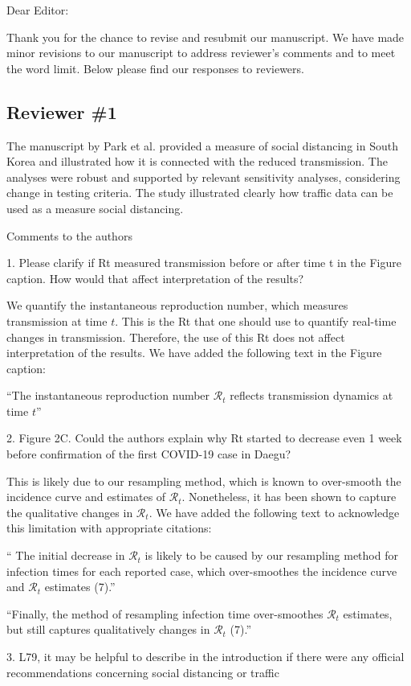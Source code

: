 \documentclass[12pt]{article}
\newcommand{\rev}{\subsection*}
\newcommand{\revtext}{\textsf}
\begin{document}
\noindent Dear Editor:

Thank you for the chance to revise and resubmit our manuscript. 
We have made minor revisions to our manuscript to address reviewer's comments and to meet the word limit.
Below please find our responses to reviewers.

\rev{Reviewer \#1}

\revtext{The manuscript by Park et al. provided a measure of social distancing in South Korea and illustrated how it is connected with the reduced transmission. The analyses were robust and supported by relevant sensitivity analyses, considering change in testing criteria. The study illustrated clearly how traffic data can be used as a measure social distancing.}

\revtext{Comments to the authors}

\revtext{1.	Please clarify if Rt measured transmission before or after time t in the Figure caption. How would that affect interpretation of the results?}

We quantify the instantaneous reproduction number, which measures transmission at time $t$. This is the Rt that one should use to quantify real-time changes in transmission. Therefore, the use of this Rt does not affect interpretation of the results. We have added the following text in the Figure caption:

``The instantaneous reproduction number $\mathcal R_t$ reflects transmission dynamics at time $t$''

\revtext{2.	Figure 2C. Could the authors explain why Rt started to decrease even 1 week before confirmation of the first COVID-19 case in Daegu? }

This is likely due to our resampling method, which is known to over-smooth the incidence curve and estimates of $\mathcal R_t$. Nonetheless, it has been shown to capture the qualitative changes in $\mathcal R_t$. We have added the following text to acknowledge this limitation with appropriate citations:

`` The initial decrease in $\mathcal R_t$ is likely to be caused by our resampling method for infection times for each reported case, which over-smoothes the incidence curve and $\mathcal R_t$ estimates (7).''

``Finally, the method of resampling infection time over-smoothes $\mathcal R_t$ estimates, but still captures qualitatively changes in $\mathcal R_t$ (7).''

\revtext{3.	L79, it may be helpful to describe in the introduction if there were any official recommendations concerning social distancing or traffic}
\end{document}
